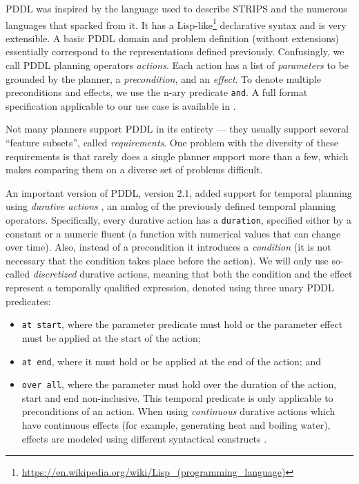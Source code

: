 PDDL was inspired by the language used to describe STRIPS \citep{Fikes1971}
and the numerous languages that sparked from it.
It has a Lisp-like\footnote{\url{https://en.wikipedia.org/wiki/Lisp_(programming_language)}}
declarative syntax and is very extensible.
A basic PDDL domain and problem definition (without extensions) essentially correspond to the representations defined previously. Confusingly, we call PDDL planning operators \textit{actions}.
Each action has a list of \textit{parameters} to be grounded by the planner,
a \textit{precondition}, and an \textit{effect}. To denote multiple
preconditions and effects, we use the n-ary predicate \texttt{and}.
A full format specification applicable to our use case is available in \citet[Appendix A]{Fox2003}.

Not many planners support PDDL in its entirety --- they usually support 
several ``feature subsets'', called \textit{requirements}.
One problem with the diversity of these requirements is that rarely does
a single planner support more than a few, which makes comparing them on a diverse
set of problems difficult.

An important version of PDDL, version 2.1, added support for temporal
planning using \textit{durative actions} \citep[Section~5]{Fox2003},
an analog of the previously defined temporal planning operators.
Specifically, every durative action has a \texttt{duration}, specified
either by a constant or a numeric fluent (a function with numerical values that
can change over time). Also, instead of a precondition it introduces a \textit{condition} (it is not necessary that the condition takes place before the action).
We will only use so-called \textit{discretized} durative actions, meaning that both the condition and the effect represent a temporally qualified expression,
denoted using three unary PDDL predicates:
\begin{itemize}
\item \texttt{at start}, where the parameter predicate must hold or the parameter effect must be applied at the start of the action;
\item \texttt{at end}, where it must hold or be applied at the end of the action; and
\item \texttt{over all}, where the parameter must hold over the duration of the action, start and end non-inclusive. This temporal predicate is only applicable to preconditions of an action. When using \textit{continuous} durative actions which have continuous effects (for example, generating heat and boiling water), effects are modeled
using different syntactical constructs \citep[Section~5.3]{Fox2003}.
\end{itemize}

